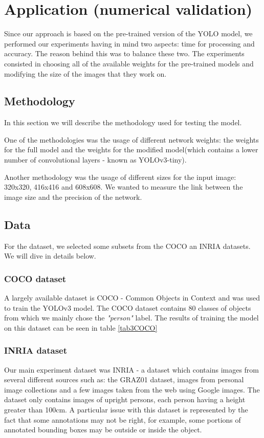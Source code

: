\documentclass[runningheads,a4paper,11pt]{report}
\begin{document}
\chapter{Application (numerical validation)}
\label{chapter:application}

Since our approach is based on the pre-trained version of the YOLO model, we performed our experiments having in mind two aspects: time for processing and accuracy. The reason behind this was to balance these two. The experiments consisted in choosing all of the available weights for the pre-trained models and modifying the size of the images that they work on.

\section{Methodology}
\label{section:methodology}
In this section we will describe the methodology used for testing the model.

One of the methodologies was the usage of different network weights: the weights for the full model and the weights for the modified model(which contains a lower number of convolutional layers - known as YOLOv3-tiny).

Another methodology was the usage of different sizes for the input image: 320x320, 416x416 and 608x608. We wanted to measure the link between the image size and the precision of the network.

\section{Data}
\label{section:data}

For the dataset, we selected some subsets from the COCO an INRIA datasets. We will dive in details below.

\subsection{COCO dataset}
A largely available dataset is COCO \cite{COCODataset} - Common Objects in Context and was used to train the YOLOv3 model. The COCO dataset contains 80 classes of objects from which we mainly chose the \textit{"person"} label. The results of training the model on this dataset can be seen in table \ref{tab3COCO}

\subsection{INRIA dataset}
Our main experiment dataset was INRIA \cite{INRIADataset} - a dataset which contains images from several different sources such as: the GRAZ01 dataset, images from personal image collections and a few images taken from the web using Google images. The dataset only contains images of upright persons, each person having a height greater than 100cm. A particular issue with this dataset is represented by the fact that some annotations may not be right, for example, some portions of annotated bounding boxes may be outside or inside the object.
\end{document}
